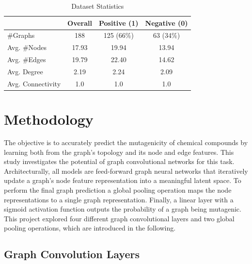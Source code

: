 \documentclass[10pt,conference,compsocconf]{IEEEtran}
\begin{document}
\begin{table}[ht]
  \centering
  \begin{tabular}{lccc}
    \toprule
    & \textbf{Overall} & \textbf{Positive} (1)& \textbf{Negative} (0) \\
    \midrule
    \#Graphs & 188 & 125 (66\%) & 63 (34\%) \\
    Avg. \#Nodes & 17.93 & 19.94 & 13.94 \\
    Avg. \#Edges & 19.79 & 22.40 & 14.62 \\
    Avg. Degree & 2.19 & 2.24 & 2.09 \\
    Avg. Connectivity & 1.0 & 1.0 & 1.0 \\
    \bottomrule
  \end{tabular}
  \caption{Dataset Statistics}
  \label{tab:dataset}
\end{table}

\section{Methodology}

The objective is to accurately predict the mutagenicity of chemical compounds by
learning both from the graph's topology and its node and edge features. This
study investigates the potential of graph convolutional networks for this task.
Architecturally, all models are feed-forward graph neural networks that
iteratively update a graph's node feature representation into a meaningful
latent space. To perform the final graph prediction a global pooling operation
maps the node representations to a single graph representation. Finally, a
linear layer with a sigmoid activation function outputs the probability of a
graph being mutagenic. This project explored four different graph convolutional
layers and two global pooling operations, which are introduced in the following.


\subsection{Graph Convolution Layers}
\end{document}
